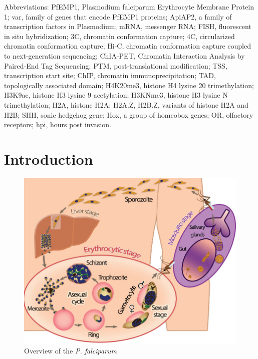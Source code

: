 Abbreviations: PfEMP1, Plasmodium falciparum Erythrocyte Membrane Protein 1;
var, family of genes that encode PfEMP1 proteins; ApiAP2, a family of
transcription factors in Plasmodium; mRNA, messenger RNA; FISH, fluorescent in
situ hybridization; 3C, chromatin conformation capture; 4C, circularized
chromatin conformation capture; Hi-C, chromatin conformation capture coupled
to next-generation sequencing; ChIA-PET, Chromatin Interaction Analysis by
Paired-End Tag Sequencing; PTM, post-translational modification; TSS,
transcription start site; ChIP, chromatin immunoprecipitation; TAD,
topologically associated domain; H4K20me3, histone H4 lysine 20
trimethylation; H3K9ac, histone H3 lysine 9 acetylation; H3K{N}me3, histone H3
lysine {N} trimethylation; H2A, histone H2A; H2A.Z, H2B.Z, variants of histone
H2A and H2B; SHH, sonic hedgehog gene; Hox, a group of homeobox genes; OR,
olfactory receptors; hpi, hours post invasion.


\section{Introduction}


\begin{figure}
\includegraphics[width=\linewidth]{figures/fig1.png}
\caption{Overview of the {\em P. falciparum}}
\label{fig:overview}
\end{figure}

